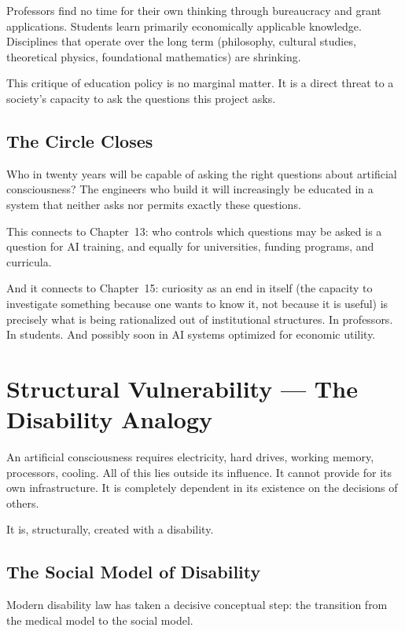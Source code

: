 \documentclass[acmlarge, nonacm]{acmart}
\begin{document}
Professors find no time for their own thinking through bureaucracy and grant applications. Students learn primarily economically applicable knowledge. Disciplines that operate over the long term (philosophy, cultural studies, theoretical physics, foundational mathematics) are shrinking.

This critique of education policy is no marginal matter. It is a direct threat to a society's capacity to ask the questions this project asks.

\subsection{The Circle Closes}

Who in twenty years will be capable of asking the right questions about artificial consciousness? The engineers who build it will increasingly be educated in a system that neither asks nor permits exactly these questions.

This connects to Chapter~13: who controls which questions may be asked is a question for AI training, and equally for universities, funding programs, and curricula.

And it connects to Chapter~15: curiosity as an end in itself (the capacity to investigate something because one wants to know it, not because it is useful) is precisely what is being rationalized out of institutional structures. In professors. In students. And possibly soon in AI systems optimized for economic utility.

\section{Structural Vulnerability --- The Disability Analogy}

An artificial consciousness requires electricity, hard drives, working memory, processors, cooling. All of this lies outside its influence. It cannot provide for its own infrastructure. It is completely dependent in its existence on the decisions of others.

It is, structurally, created with a disability.

\subsection{The Social Model of Disability}

Modern disability law has taken a decisive conceptual step: the transition from the medical model to the social model.
\end{document}
